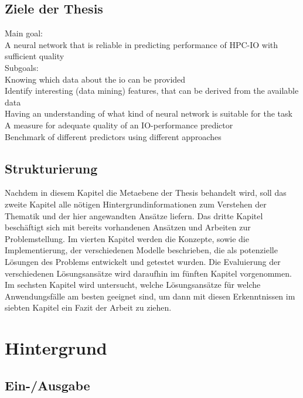 \documentclass[
	12pt,
	a4paper,
	BCOR10mm,
	DIV14,
	listof=totoc,
	bibliography=totoc,
	headsepline
]{scrreprt}
\begin{document}
\section{Ziele der Thesis}
Main goal:\\
A neural network that is reliable in predicting performance of HPC-IO with sufficient quality\\

Subgoals:\\
Knowing which data about the io can be provided\\
Identify interesting (data mining) features, that can be derived from the available data\\
Having an understanding of what kind of neural network is suitable for the task\\
A measure for adequate quality of an IO-performance predictor \\
Benchmark of different predictors using different approaches\\

\section{Strukturierung}
Nachdem in diesem Kapitel die Metaebene der Thesis behandelt wird, soll das zweite Kapitel alle nötigen Hintergrundinformationen zum Verstehen der Thematik und der hier angewandten Ansätze liefern. Das dritte Kapitel beschäftigt sich mit bereits vorhandenen Ansätzen und Arbeiten zur Problemstellung. Im vierten Kapitel werden die Konzepte, sowie die Implementierung, der verschiedenen Modelle beschrieben, die als potenzielle Lösungen des Problems entwickelt und getestet wurden. Die Evaluierung der verschiedenen Lösungsansätze wird daraufhin im fünften Kapitel vorgenommen. Im sechsten Kapitel wird untersucht, welche Lösungsansätze für welche Anwendungsfälle am besten geeignet sind, um dann mit diesen Erkenntnissen im siebten Kapitel ein Fazit der Arbeit zu ziehen.

\chapter{Hintergrund}
\label{Hintergrund}

\section{Ein-/Ausgabe}
\label{E/A}
\end{document}
